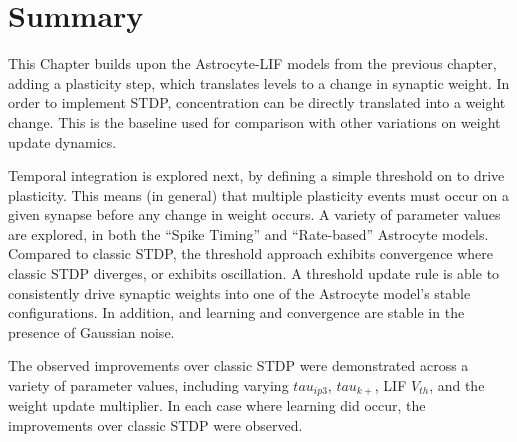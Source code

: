 
\section{Summary}

This Chapter builds upon the Astrocyte-LIF models from the previous chapter,
adding a plasticity step, which translates \ca levels to a change
in synaptic weight. In order to implement STDP, \ca concentration can be directly
translated into a weight change. This is the baseline used for comparison with
other variations on weight update dynamics.

Temporal integration is explored next, by defining a simple threshold on
\ca to drive plasticity. This means (in general) that multiple plasticity events
must occur on a given synapse before any change in weight occurs. A variety of
parameter values are explored, in both the ``Spike Timing'' and ``Rate-based''
Astrocyte models. Compared to classic STDP, the threshold approach exhibits
convergence where classic STDP diverges, or exhibits oscillation. A threshold
update rule is able to consistently drive synaptic weights into one of the
Astrocyte model's stable configurations. In addition, and learning and
convergence are stable in the presence of Gaussian noise.

The observed improvements over classic STDP were demonstrated across a variety
of parameter values, including varying $tau_{ip3}$, $tau_{k+}$, LIF $V_{th}$,
and the weight update multiplier. In each case where learning did occur, the
improvements over classic STDP were observed.

